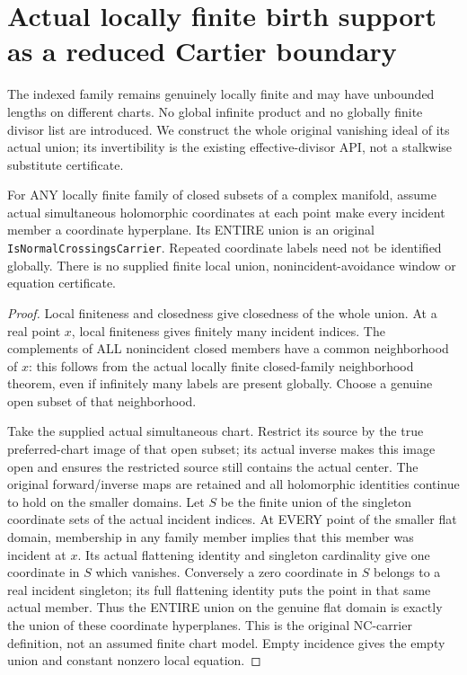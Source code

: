 \section{Actual locally finite birth support as a reduced Cartier boundary}

The indexed family remains genuinely locally finite and may have
unbounded lengths on different charts. No global infinite product and
no globally finite divisor list are introduced. We construct the whole
original vanishing ideal of its actual union; its invertibility is the
existing effective-divisor API, not a stalkwise substitute certificate.

\begin{theorem}
\label{hir:sharp-actual-locally-finite-coordinate-union-nc}
\leanok
For ANY locally finite family of closed subsets of a complex manifold,
assume actual simultaneous holomorphic coordinates at each point make
every incident member a coordinate hyperplane. Its ENTIRE union is an
original \texttt{IsNormalCrossingsCarrier}. Repeated coordinate labels
need not be identified globally. There is no supplied finite local
union, nonincident-avoidance window or equation certificate.
\end{theorem}
\begin{proof}
Local finiteness and closedness give closedness of the whole union.
At a real point $x$, local finiteness gives finitely many incident
indices. The complements of ALL nonincident closed members have a
common neighborhood of $x$: this follows from the actual locally finite
closed-family neighborhood theorem, even if infinitely many labels are
present globally. Choose a genuine open subset of that neighborhood.

Take the supplied actual simultaneous chart. Restrict its source by
the true preferred-chart image of that open subset; its actual inverse
makes this image open and ensures the restricted source still contains
the actual center. The original forward/inverse maps are retained and
all holomorphic identities continue to hold on the smaller domains.
Let $S$ be the finite union of the singleton coordinate sets of the
actual incident indices. At EVERY point of the smaller flat domain,
membership in any family member implies that this member was incident
at $x$. Its actual flattening identity and singleton cardinality give
one coordinate in $S$ which vanishes. Conversely a zero coordinate in
$S$ belongs to a real incident singleton; its full flattening identity
puts the point in that same actual member. Thus the ENTIRE union on
the genuine flat domain is exactly the union of these coordinate
hyperplanes. This is the original NC-carrier definition, not an
assumed finite chart model. Empty incidence gives the empty union and
constant nonzero local equation.
\end{proof}


